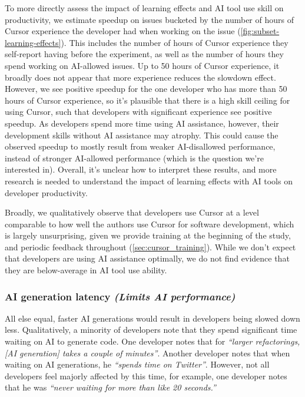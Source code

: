 \documentclass{article}
\newcommand{\devquote}[1]{\textcolor{quotecolor}{\textit{``#1''}}}
\begin{document}
To more directly assess the impact of learning effects and AI tool use skill on productivity, we estimate speedup on issues bucketed by the number of hours of Cursor experience the developer had when working on the issue (\autoref{fig:subset-learning-effects}). This includes the number of hours of Cursor experience they self-report having before the experiment, as well as the number of hours they spend working on AI-allowed issues. Up to 50 hours of Cursor experience, it broadly does not appear that more experience reduces the slowdown effect. However, we see positive speedup for the one developer who has more than 50 hours of Cursor experience, so it's plausible that there is a high skill ceiling for using Cursor, such that developers with significant experience see positive speedup. 
As developers spend more time using AI assistance, however, their development skills without AI assistance may atrophy. This could cause the observed speedup to mostly result from weaker AI-disallowed performance, instead of stronger AI-allowed performance (which is the question we're interested in). Overall, it's unclear how to interpret these results, and more research is needed to understand the impact of learning effects with AI tools on developer productivity.

Broadly, we qualitatively observe that developers use Cursor at a level comparable to how well the authors use Cursor for software development, which is largely unsurprising, given we provide training at the beginning of the study, and periodic feedback throughout (\autoref{sec:cursor_training}). While we don't expect that developers are using AI assistance optimally, we do not find evidence that they are below-average in AI tool use ability.


\subsubsection{AI generation latency \textnormal{\textit{(Limits AI performance)}}}
\label{sec:factor-ai-generation-latency}

All else equal, faster AI generations would result in developers being slowed down less. Qualitatively, a minority of developers note that they spend significant time waiting on AI to generate code. One developer notes that for \devquote{larger refactorings, [AI generation] takes a couple of minutes}. Another developer notes that when waiting on AI generations, he \devquote{spends time on Twitter}. However, not all developers feel majorly affected by this time, for example, one developer notes that he was \devquote{never waiting for more than like 20 seconds.}
\end{document}
